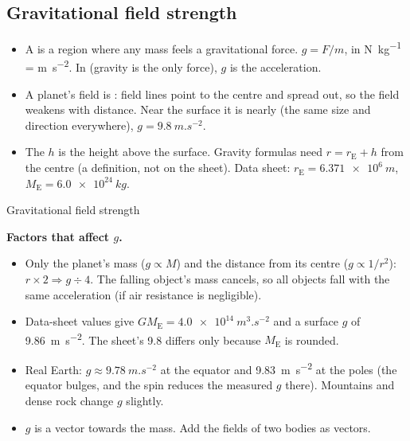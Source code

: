 \subsection{Gravitational field strength}
\begin{itemize}
  \item A  is a region where any mass feels a gravitational force.
        $g = F/m$, in \si{N.kg^{-1}} = \si{m.s^{-2}}. In  (gravity is the only
        force), $g$ is the acceleration.
  \item A planet's field is : field lines point to the centre and spread out, so the
        field weakens with distance. Near the surface it is nearly  (the same
        size and direction everywhere), $g = \qty{9.8}{m.s^{-2}}$.
  \item The  $h$ is the height above the surface. Gravity formulas need
        $r = r_\mathrm{E} + h$ from the centre (a definition, not on the sheet). Data sheet:
        $r_\mathrm{E} = \qty{6.371e6}{m}$, $M_\mathrm{E} = \qty{6.0e24}{kg}$.
\end{itemize}

\begin{formulacard}[notonsheet]{Gravitational field strength}
  \begin{symbols}
  \end{symbols}
\end{formulacard}

\textbf{Factors that affect $g$.}
\begin{itemize}
  \item Only the planet's mass ($g \propto M$) and the distance from its centre ($g \propto 1/r^2$):
        $r \times 2 \Rightarrow g \div 4$. The falling object's mass cancels, so all objects fall
        with the same acceleration (if air resistance is negligible).
  \item Data-sheet values give $GM_\mathrm{E} = \qty{4.0e14}{m^3.s^{-2}}$ and a surface $g$ of
        \qty{9.86}{m.s^{-2}}. The sheet's 9.8 differs only because $M_\mathrm{E}$ is rounded.
  \item Real Earth: $g \approx \qty{9.78}{m.s^{-2}}$ at the equator and \qty{9.83}{m.s^{-2}} at
        the poles (the equator bulges, and the spin reduces the measured $g$ there). Mountains and dense rock
        change $g$ slightly.
  \item $g$ is a vector towards the mass. Add the fields of two bodies as vectors.
\end{itemize}

